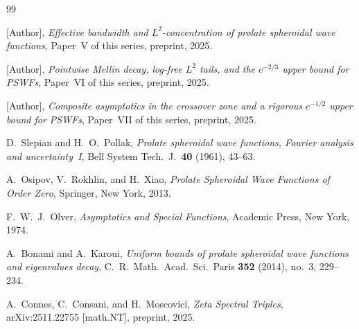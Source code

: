 \documentclass[12pt,a4paper]{amsart}
\theoremstyle{definition}
\theoremstyle{remark}
\begin{document}
\begin{thebibliography}{99}

[Author],
\textit{Effective bandwidth and $L^2$-concentration
of prolate spheroidal wave functions},
Paper~V of this series, preprint, 2025.

[Author],
\textit{Pointwise Mellin decay, log-free $L^2$ tails,
and the $c^{-2/3}$ upper bound for PSWFs},
Paper~VI of this series, preprint, 2025.

[Author],
\textit{Composite asymptotics in the crossover zone
and a rigorous $c^{-1/2}$ upper bound for PSWFs},
Paper~VII of this series, preprint, 2025.

D.~Slepian and H.~O.~Pollak,
\textit{Prolate spheroidal wave functions,
Fourier analysis and uncertainty~I},
Bell System Tech.\ J.\ \textbf{40} (1961), 43--63.

A.~Osipov, V.~Rokhlin, and H.~Xiao,
\textit{Prolate Spheroidal Wave Functions of Order Zero},
Springer, New York, 2013.

F.~W.~J.~Olver,
\textit{Asymptotics and Special Functions},
Academic Press, New York, 1974.

A.~Bonami and A.~Karoui,
\textit{Uniform bounds of prolate spheroidal wave
functions and eigenvalues decay},
C.\ R.\ Math.\ Acad.\ Sci.\ Paris \textbf{352} (2014),
no.~3, 229--234.

A.~Connes, C.~Consani, and H.~Moscovici,
\textit{Zeta Spectral Triples},
arXiv:2511.22755 [math.NT], preprint, 2025.

\end{thebibliography}
\end{document}
